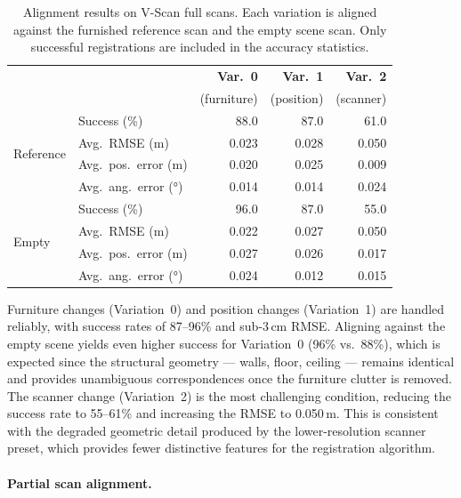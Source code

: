 \begin{table}[hb]
    \centering
    \caption[V-Scan full scan alignment]{Alignment results on V-Scan full scans. Each variation is aligned against the furnished reference scan and the empty scene scan. Only successful registrations are included in the accuracy statistics.}
    \label{tab:4_vscan_full}
    \begin{tabular}{l l r r r}
        \toprule
        & & \textbf{Var.~0} & \textbf{Var.~1} & \textbf{Var.~2} \\
        & & (furniture) & (position) & (scanner) \\
        \midrule
        \multirow{4}{*}{Reference}
            & Success (\%)         & 88.0  & 87.0  & 61.0  \\
            & Avg.\ RMSE (m)       & 0.023 & 0.028 & 0.050 \\
            & Avg.\ pos.\ error (m) & 0.020 & 0.025 & 0.009 \\
            & Avg.\ ang.\ error (°) & 0.014 & 0.014 & 0.024 \\
        \midrule
        \multirow{4}{*}{Empty}
            & Success (\%)         & 96.0  & 87.0  & 55.0  \\
            & Avg.\ RMSE (m)       & 0.022 & 0.027 & 0.050 \\
            & Avg.\ pos.\ error (m) & 0.027 & 0.026 & 0.017 \\
            & Avg.\ ang.\ error (°) & 0.024 & 0.012 & 0.015 \\
        \bottomrule
    \end{tabular}
\end{table}

Furniture changes (Variation~0) and position changes (Variation~1) are handled reliably, with success rates of 87--96\% and sub-3\,cm RMSE. Aligning against the empty scene yields even higher success for Variation~0 (96\% vs.\ 88\%), which is expected since the structural geometry --- walls, floor, ceiling --- remains identical and provides unambiguous correspondences once the furniture clutter is removed. The scanner change (Variation~2) is the most challenging condition, reducing the success rate to 55--61\% and increasing the RMSE to 0.050\,m. This is consistent with the degraded geometric detail produced by the lower-resolution scanner preset, which provides fewer distinctive features for the registration algorithm.

\paragraph{Partial scan alignment.}

